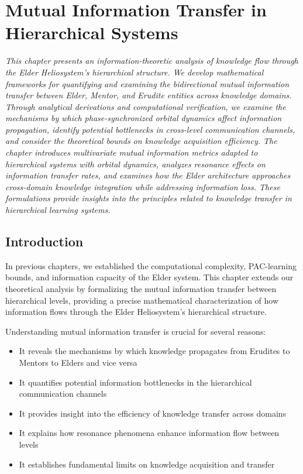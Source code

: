 \chapter{Mutual Information Transfer in Hierarchical Systems}

\textit{This chapter presents an information-theoretic analysis of knowledge flow through the Elder Heliosystem's hierarchical structure. We develop mathematical frameworks for quantifying and examining the bidirectional mutual information transfer between Elder, Mentor, and Erudite entities across knowledge domains. Through analytical derivations and computational verification, we examine the mechanisms by which phase-synchronized orbital dynamics affect information propagation, identify potential bottlenecks in cross-level communication channels, and consider the theoretical bounds on knowledge acquisition efficiency. The chapter introduces multivariate mutual information metrics adapted to hierarchical systems with orbital dynamics, analyzes resonance effects on information transfer rates, and examines how the Elder architecture approaches cross-domain knowledge integration while addressing information loss. These formulations provide insights into the principles related to knowledge transfer in hierarchical learning systems.}

\section{Introduction}

In previous chapters, we established the computational complexity, PAC-learning bounds, and information capacity of the Elder system. This chapter extends our theoretical analysis by formalizing the mutual information transfer between hierarchical levels, providing a precise mathematical characterization of how information flows through the Elder Heliosystem's hierarchical structure.

Understanding mutual information transfer is crucial for several reasons:

\begin{itemize}
    \item It reveals the mechanisms by which knowledge propagates from Erudites to Mentors to Elders and vice versa
    \item It quantifies potential information bottlenecks in the hierarchical communication channels
    \item It provides insight into the efficiency of knowledge transfer across domains
    \item It explains how resonance phenomena enhance information flow between levels
    \item It establishes fundamental limits on knowledge acquisition and transfer
\end{itemize}

